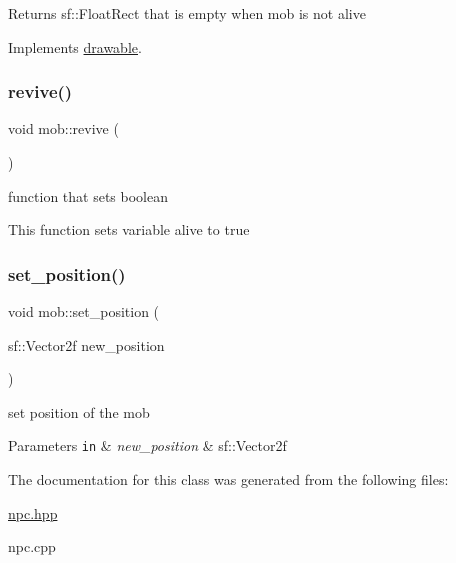 \begin{DoxyReturn}{Returns}
sf\+::\+Float\+Rect that is empty when mob is not alive 
\end{DoxyReturn}


Implements \hyperlink{classdrawable_ae013ac0be47538be9ce885d6642daf73}{drawable}.

\mbox{\label{classmob_a3bce6c06653881f8be86fbc60a2b67cb}} 
\subsubsection{\texorpdfstring{revive()}{revive()}}
{\footnotesize\ttfamily void mob\+::revive (\begin{DoxyParamCaption}{ }\end{DoxyParamCaption})}



function that sets boolean 

This function sets variable alive to true \mbox{\label{classmob_a6556e84e416fd496450d18dd1d0eb1f2}} 
\subsubsection{\texorpdfstring{set\+\_\+position()}{set\_position()}}
{\footnotesize\ttfamily void mob\+::set\+\_\+position (\begin{DoxyParamCaption}\item[{sf\+::\+Vector2f}]{new\+\_\+position }\end{DoxyParamCaption})}



set position of the mob 


\begin{DoxyParams}[1]{Parameters}
\mbox{\tt in}  & {\em new\+\_\+position} & sf\+::\+Vector2f \\
\hline
\end{DoxyParams}


The documentation for this class was generated from the following files\+:\begin{DoxyCompactItemize}
\item 
\hyperlink{npc_8hpp}{npc.\+hpp}\item 
npc.\+cpp\end{DoxyCompactItemize}
